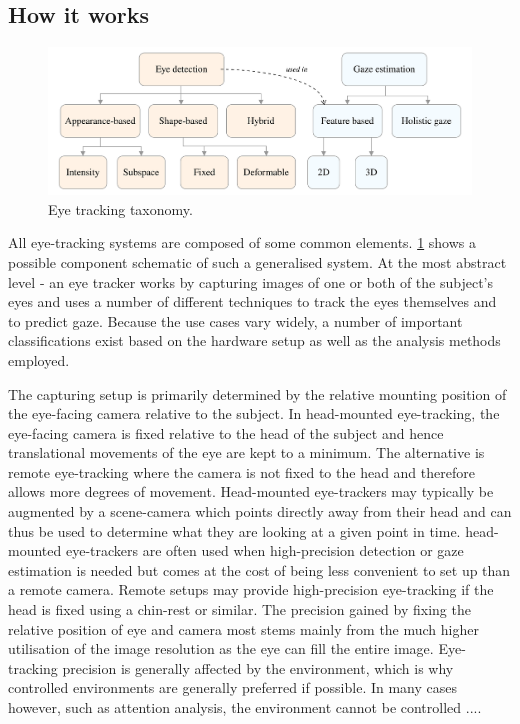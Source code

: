 \subsection{How it works}
\begin{figure}
	\includegraphics[width=1\textwidth]{figures/model/taxonomy}
	\caption{Eye tracking taxonomy.}\label{fig:taxonomy}
\end{figure}
All eye-tracking systems are composed of some common elements. \cref{fig:taxonomy} shows a possible component schematic of such a generalised system. At the most abstract level - an eye tracker works by capturing images of one or both of the subject's eyes and uses a number of different techniques to track the eyes themselves and to predict gaze. Because the use cases vary widely, a number of important classifications exist based on the hardware setup as well as the analysis methods employed.

The capturing setup is primarily determined by the relative mounting position of the eye-facing camera relative to the subject. In \gls{head-mounted} \gls{eye-tracking},  the eye-facing camera is fixed relative to the head of the subject and hence translational movements of the eye are kept to a minimum. The alternative is remote \gls{eye-tracking} where the camera is not fixed to the head and therefore allows more degrees of movement. Head-mounted eye-trackers may typically be augmented by a \gls{scene-camera} which points directly away from their head and can thus be used to determine what they are looking at a given point in time. \Gls{head-mounted} \gls{eye-tracker}s are often used when high-precision detection or gaze estimation is needed but comes at the cost of being less convenient to set up than a remote camera. Remote setups may provide high-precision eye-tracking if the head is fixed using a chin-rest or similar. The precision gained by fixing the relative position of eye and camera most stems mainly from the much higher utilisation of the image resolution as the eye can fill the entire image. Eye-tracking precision is generally affected by the environment, which is why controlled environments are generally preferred if possible. In many cases however, such as attention analysis, the environment cannot be controlled .... 

